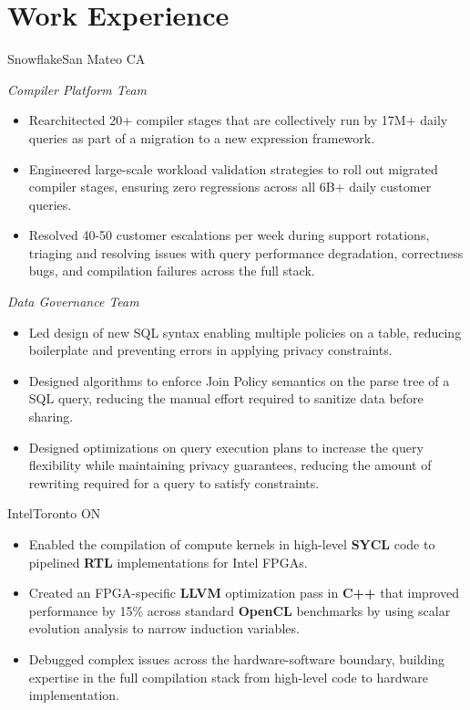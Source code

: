 \documentclass{moderncv}
\begin{document}
\section{Work Experience}

{Snowflake}{San Mateo CA}{}
{
    \textit{Compiler Platform Team}
    \begin{itemize}
        \item Rearchitected 20+ compiler stages that are collectively run by 17M+ daily queries as part of a migration to a new expression framework.
        \item Engineered large-scale workload validation strategies to roll out migrated compiler stages, ensuring zero regressions across all 6B+ daily customer queries.
        \item Resolved 40-50 customer escalations per week during support rotations, triaging and resolving issues  with query performance degradation, correctness bugs, and compilation failures across the full stack.
    \end{itemize}
    \textit{Data Governance Team}
    \begin{itemize}
        \item Led design of new SQL syntax enabling multiple policies on a table, reducing boilerplate and preventing errors in applying privacy constraints. %
        \item Designed algorithms to enforce Join Policy semantics on the parse tree of a SQL query, reducing the manual effort required to sanitize data before sharing. %
        \item Designed optimizations on query execution plans to increase the query flexibility while maintaining privacy guarantees, reducing the amount of rewriting required for a query to satisfy constraints.  %
    \end{itemize}
}

{Intel}{Toronto ON}{}
{\begin{itemize}
    \item Enabled the compilation of compute kernels in high-level \textbf{SYCL} code to pipelined \textbf{RTL} implementations for Intel FPGAs.
    \item Created an FPGA-specific \textbf{LLVM} optimization pass in \textbf{C++} that improved performance by 15\% across standard \textbf{OpenCL} benchmarks by using scalar evolution analysis to narrow induction variables.
    \item Debugged complex issues across the hardware-software boundary, building expertise in the full compilation stack from high-level code to hardware implementation.
\end{itemize}}
\end{document}
